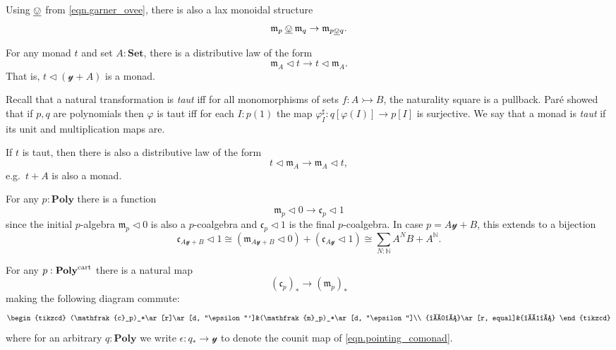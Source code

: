 \documentclass[11pt, one side, article]{memoir}
\theoremstyle{definition}
\theoremstyle{plain}
\newcommand{\Cat}[1]{\mathbf{#1}}%
\newcommand{\inj}{\rightarrowtail}
\newcommand{\tn}[1]{\textnormal{#1}}
\newcommand{\ul}[1]{\underline{#1}}
\newcommand{\nn}{\mathbb{N}}
\newcommand{\smset}{\Cat{Set}}
\newcommand{\yon}{{\mathcal{y}}}
\newcommand{\poly}{\Cat{Poly}}
\newcommand{\cart}{\tn{cart}}
\newcommand{\polycart}{\poly^\cart}
\newcommand{\0}{\textsf{0}}
\newcommand{\1}{\tn{\textsf{1}}}
\newcommand{\tri}{\mathbin{\triangleleft}}
\newcommand{\cofree}{\mathfrak{c}}
\newcommand{\free}{\mathfrak{m}}
\newcommand{\garner}[1]{\mathbin{\ul{#1}}}
\begin{document}

Using $\garner{\ovee}$ from \cref{eqn.garner_ovee}, there is also a lax monoidal structure
\begin{equation}
	\free_p\garner{\ovee}\free_q\to\free_{p\garner{\ovee}q}.
\end{equation}

For any monad $t$ and set $A:\smset$, there is a distributive law of the form
\begin{equation}
	\free_A\tri t\to t\tri\free_A.
\end{equation}
That is, $t\tri(\yon+A)$ is a monad.

Recall that a natural transformation is \emph{taut} iff for all monomorphisms of sets $f\colon A\inj B$, the naturality square is a pullback. Par\'{e} showed that if $p,q$ are polynomials then $\varphi$ is taut iff for each $I:p(1)$ the map $\varphi_I^\sharp\colon q[\varphi(I)]\to p[I]$ is surjective. We say that a monad is \emph{taut} if its unit and multiplication maps are.

If $t$ is taut, then there is also a distributive law of the form
\begin{equation}\label{eqn.taut_distributive}
	t\tri\free_A\to \free_A\tri t,
\end{equation}
e.g.\ $t+A$ is also a monad. 


For any $p:\poly$ there is a function
\begin{equation}
	\free_p\tri 0\to\cofree_p\tri 1
\end{equation}
since the initial $p$-algebra $\free_p\tri 0$ is also a $p$-coalgebra and $\cofree_p\tri 1$ is the final $p$-coalgebra. In case $p=A\yon+B$, this extends to a bijection 
\begin{equation}
	\cofree_{A\yon+B}\tri 1
	\cong
	\left(\free_{A\yon+B}\tri 0\right) +\left(\cofree_{A\yon}\tri 1\right)
	\cong\sum_{N:\nn}A^NB+A^\nn.
\end{equation}

For any $p:\polycart$ there is a natural map
\begin{equation}
	(\cofree_p)_*\to(\free_p)_*
\end{equation}
making the following diagram commute:
\begin{equation}
\begin{tikzcd}
	(\cofree_p)_*\ar[r]\ar[d, "\epsilon"']&(\free_p)_*\ar[d, "\epsilon"]\\
	\yon\ar[r, equal]&\yon
\end{tikzcd}
\end{equation}
where for an arbitrary $q:\poly$ we write $\epsilon\colon q_*\to\yon$ to denote the counit map of \cref{eqn.pointing_comonad}.
\end{document}
